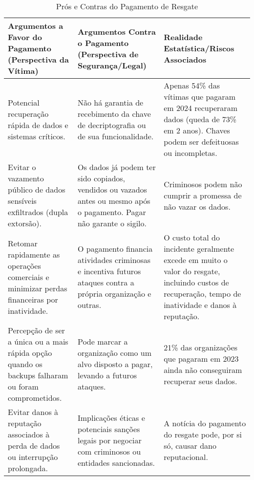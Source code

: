 \begin{table}[htbp]
\centering
\small
\caption{Prós e Contras do Pagamento de Resgate}
\label{tab:tabela_pagamento_resgate.tex}
\begin{tabular}{|p{4cm}|p{5cm}|p{5.5cm}|}
\hline
\textbf{Argumentos a Favor do Pagamento (Perspectiva da Vítima)} & \textbf{Argumentos Contra o Pagamento (Perspectiva de Segurança/Legal)} & \textbf{Realidade Estatística/Riscos Associados} \\
\hline
Potencial recuperação rápida de dados e sistemas críticos. & Não há garantia de recebimento da chave de decriptografia ou de sua funcionalidade. & Apenas 54\% das vítimas que pagaram em 2024 recuperaram dados (queda de 73\% em 2 anos). Chaves podem ser defeituosas ou incompletas. \\
\hline
Evitar o vazamento público de dados sensíveis exfiltrados (dupla extorsão). & Os dados já podem ter sido copiados, vendidos ou vazados antes ou mesmo após o pagamento. Pagar não garante o sigilo. & Criminosos podem não cumprir a promessa de não vazar os dados. \\
\hline
Retomar rapidamente as operações comerciais e minimizar perdas financeiras por inatividade. & O pagamento financia atividades criminosas e incentiva futuros ataques contra a própria organização e outras. & O custo total do incidente geralmente excede em muito o valor do resgate, incluindo custos de recuperação, tempo de inatividade e danos à reputação. \\
\hline
Percepção de ser a única ou a mais rápida opção quando os backups falharam ou foram comprometidos. & Pode marcar a organização como um alvo disposto a pagar, levando a futuros ataques. & 21\% das organizações que pagaram em 2023 ainda não conseguiram recuperar seus dados. \\
\hline
Evitar danos à reputação associados à perda de dados ou interrupção prolongada. & Implicações éticas e potenciais sanções legais por negociar com criminosos ou entidades sancionadas. & A notícia do pagamento do resgate pode, por si só, causar dano reputacional. \\
\hline
\end{tabular}
\end{table}

